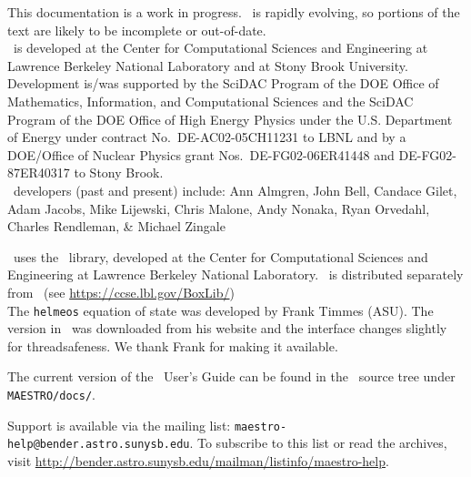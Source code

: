This documentation is a work in progress.  \maestro\ is rapidly
evolving, so portions of the text are likely to be incomplete or
out-of-date. \\

\noindent \maestro\ is developed at the Center for Computational Sciences and
Engineering at Lawrence Berkeley National Laboratory and at Stony
Brook University.  Development is/was supported by the SciDAC Program of
the DOE Office of Mathematics, Information, and Computational Sciences
and the SciDAC Program of the DOE Office of High Energy Physics under
the U.S. Department of Energy under contract No.\ DE-AC02-05CH11231 to
LBNL and by a DOE/Office of Nuclear Physics grant Nos.\
DE-FG02-06ER41448 and DE-FG02-87ER40317 to Stony Brook.  \\

\noindent \maestro\ developers (past and present) include: Ann Almgren, John
Bell, Candace Gilet, Adam Jacobs, Mike Lijewski, Chris Malone, Andy
Nonaka, Ryan Orvedahl, Charles Rendleman, \& Michael Zingale

\noindent \maestro\ uses the \boxlib\ library,
developed at the Center for Computational Sciences and Engineering at
Lawrence Berkeley National Laboratory.  \boxlib\ is distributed
separately from \maestro\ (see
\url{https://ccse.lbl.gov/BoxLib/})
\\

\noindent The {\tt helmeos} equation of state was developed by Frank Timmes (ASU).
The version in \maestro\ was downloaded from his website and the
interface changes slightly for threadsafeness.  We thank Frank for
making it available.

\noindent The current version of the \maestro\ User's Guide can be found in 
the \maestro\ source tree under {\tt MAESTRO/docs/}.


\noindent Support is available via the mailing list: {\tt maestro-help@bender.astro.sunysb.edu}.  To subscribe to this list or read the archives, visit
\url{http://bender.astro.sunysb.edu/mailman/listinfo/maestro-help}.
